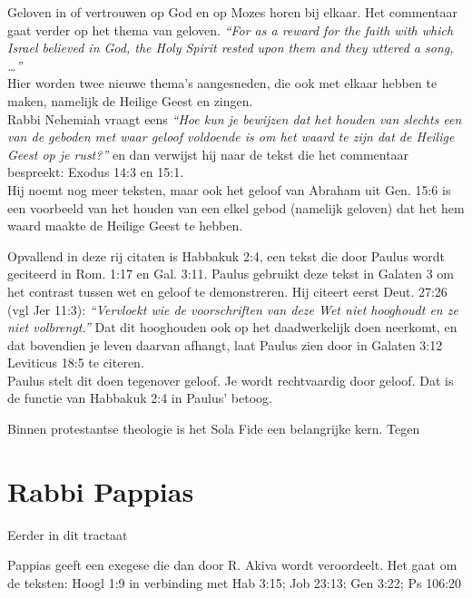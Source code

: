 \documentclass[a4paper,11pt]{article}
\newcommand{\ibibleverse}[1]{#1}
\newcommand{\h}[1]{{\heb {\beginR{#1}\endR}}}
\newcommand{\q}[1]{\textit{\enquote{#1}}}
\begin{document}
Geloven in of vertrouwen op God en op Mozes horen bij elkaar.
Het commentaar gaat verder op het thema van geloven. \q{For as a reward for the faith with which Israel believed in God, the Holy Spirit rested upon them and they uttered a song, \ldots} \\ %
Hier worden twee nieuwe thema's aangesneden, die ook met elkaar hebben te maken, namelijk de Heilige Geest en zingen.\\
Rabbi Nehemiah vraagt eens \q{Hoe kun je bewijzen dat het houden van slechts een van de geboden met waar geloof voldoende is om het waard te zijn dat de Heilige Geest op je rust?} en dan verwijst hij naar de tekst die het commentaar bespreekt: Exodus 14:3 en 15:1. \\ 
Hij noemt nog meer teksten, maar ook het geloof van Abraham uit Gen. 15:6 is een voorbeeld van het houden van een elkel gebod (namelijk geloven) dat het hem waard maakte de Heilige Geest te hebben.



Opvallend in deze rij citaten is Habbakuk 2:4, een tekst die door Paulus wordt geciteerd in Rom. 1:17 en Gal. 3:11. Paulus gebruikt deze tekst in Galaten 3 om het contrast tussen wet en geloof te demonstreren. Hij citeert eerst Deut. 27:26 (vgl Jer 11:3): \q{Vervloekt wie de voorschriften van deze Wet niet hooghoudt en ze niet volbrengt.} Dat dit hooghouden ook op het daadwerkelijk doen neerkomt, en dat bovendien je leven daarvan afhangt, laat Paulus zien door in Galaten 3:12 Leviticus 18:5 te citeren.\\
Paulus stelt dit doen tegenover geloof. Je wordt rechtvaardig door geloof. Dat is de functie van Habbakuk 2:4 in Paulus' betoog.

Binnen protestantse theologie is het Sola Fide een belangrijke kern. Tegen 

\section{Rabbi Pappias}
Eerder in dit tractaat

Pappias geeft een exegese die dan door R. Akiva wordt veroordeelt. Het gaat om de teksten: 
Hoogl 1:9 in verbinding met Hab 3:15; Job 23:13; Gen 3:22; Ps 106:20



\printbibliography[heading=lit]
\end{document}
